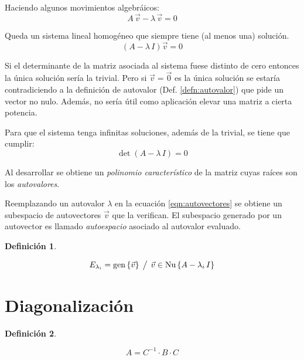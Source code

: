 \documentclass[a5paper,12pt,twoside]{book}
\newtheorem{defn}{{Definición}}[chapter]
\begin{document}
Haciendo algunos movimientos algebráicos:
\begin{equation*}
    A \, \Vec{v} - \lambda \, \Vec{v} = 0
\end{equation*}

Queda un sistema lineal homogéneo que siempre tiene (al menos una) solución.
\begin{equation}
    \left( A - \lambda \, I \right) \Vec{v} = 0
    \label{eqn:autovectores}
\end{equation}

Si el determinante de la matriz asociada al sistema fuese distinto de cero entonces la única solución sería la trivial.
Pero si $\Vec{v}=\Vec{0}$ es la única solución se estaría contradiciendo a la definición de autovalor (Def. \ref{defn:autovalor}) que pide un vector no nulo.
Además, no sería útil como aplicación elevar una matriz a cierta potencia.

Para que el sistema tenga infinitas soluciones, además de la trivial, se tiene que cumplir:
\begin{equation*}
    \operatorname{det} \left( A - \lambda \, I \right) = 0
\end{equation*}

Al desarrollar se obtiene un \emph{polinomio característico} de la matriz cuyas raíces son los \emph{autovalores}.

Reemplazando un autovalor $\lambda$ en la ecuación \ref{eqn:autovectores} se obtiene un subespacio de autovectores $\Vec{v}$ que la verifican.
El subespacio generado por un autovector es llamado \emph{autoespacio} asociado al autovalor evaluado.

\begin{mdframed}[style=DefinitionFrame]
    \begin{defn}
    \end{defn}
    \begin{equation*}
        E_{\lambda_i} = \operatorname{gen} { \left\{ {\Vec{v}} \right\} } \hspace{1ex} \big/ \hspace{1ex} \Vec{v} \in \operatorname{Nu} { \left\{ {A - \lambda_i \, I} \right\} }
    \end{equation*}
\end{mdframed}


\section{Diagonalización}

\begin{mdframed}[style=DefinitionFrame]
    \begin{defn}
    \end{defn}
    \begin{equation*}
        A = C^{-1} \cdot B \cdot C
    \end{equation*}
\end{mdframed}
\end{document}
